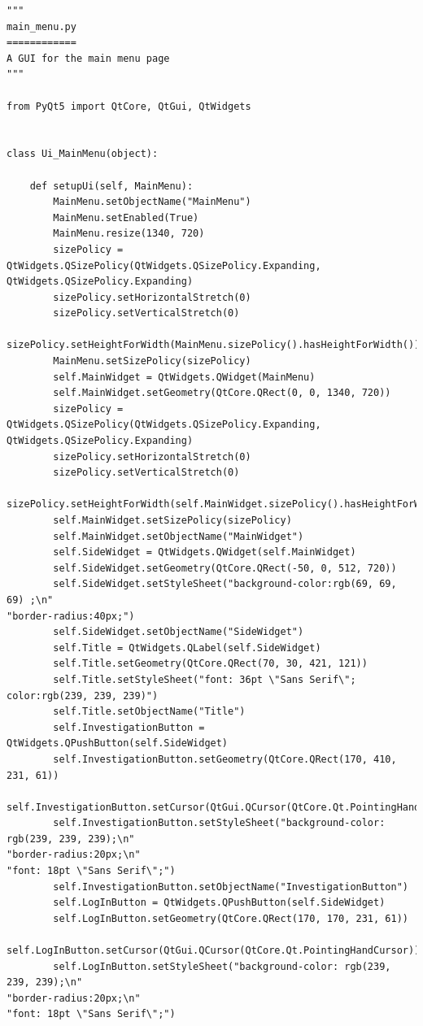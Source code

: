 \documentclass{article}
\begin{document}
\begin{lstlisting}
"""
main_menu.py
============
A GUI for the main menu page
"""

from PyQt5 import QtCore, QtGui, QtWidgets


class Ui_MainMenu(object):

    def setupUi(self, MainMenu):
        MainMenu.setObjectName("MainMenu")
        MainMenu.setEnabled(True)
        MainMenu.resize(1340, 720)
        sizePolicy = QtWidgets.QSizePolicy(QtWidgets.QSizePolicy.Expanding, QtWidgets.QSizePolicy.Expanding)
        sizePolicy.setHorizontalStretch(0)
        sizePolicy.setVerticalStretch(0)
        sizePolicy.setHeightForWidth(MainMenu.sizePolicy().hasHeightForWidth())
        MainMenu.setSizePolicy(sizePolicy)
        self.MainWidget = QtWidgets.QWidget(MainMenu)
        self.MainWidget.setGeometry(QtCore.QRect(0, 0, 1340, 720))
        sizePolicy = QtWidgets.QSizePolicy(QtWidgets.QSizePolicy.Expanding, QtWidgets.QSizePolicy.Expanding)
        sizePolicy.setHorizontalStretch(0)
        sizePolicy.setVerticalStretch(0)
        sizePolicy.setHeightForWidth(self.MainWidget.sizePolicy().hasHeightForWidth())
        self.MainWidget.setSizePolicy(sizePolicy)
        self.MainWidget.setObjectName("MainWidget")
        self.SideWidget = QtWidgets.QWidget(self.MainWidget)
        self.SideWidget.setGeometry(QtCore.QRect(-50, 0, 512, 720))
        self.SideWidget.setStyleSheet("background-color:rgb(69, 69, 69) ;\n"
"border-radius:40px;")
        self.SideWidget.setObjectName("SideWidget")
        self.Title = QtWidgets.QLabel(self.SideWidget)
        self.Title.setGeometry(QtCore.QRect(70, 30, 421, 121))
        self.Title.setStyleSheet("font: 36pt \"Sans Serif\"; color:rgb(239, 239, 239)")
        self.Title.setObjectName("Title")
        self.InvestigationButton = QtWidgets.QPushButton(self.SideWidget)
        self.InvestigationButton.setGeometry(QtCore.QRect(170, 410, 231, 61))
        self.InvestigationButton.setCursor(QtGui.QCursor(QtCore.Qt.PointingHandCursor))
        self.InvestigationButton.setStyleSheet("background-color: rgb(239, 239, 239);\n"
"border-radius:20px;\n"
"font: 18pt \"Sans Serif\";")
        self.InvestigationButton.setObjectName("InvestigationButton")
        self.LogInButton = QtWidgets.QPushButton(self.SideWidget)
        self.LogInButton.setGeometry(QtCore.QRect(170, 170, 231, 61))
        self.LogInButton.setCursor(QtGui.QCursor(QtCore.Qt.PointingHandCursor))
        self.LogInButton.setStyleSheet("background-color: rgb(239, 239, 239);\n"
"border-radius:20px;\n"
"font: 18pt \"Sans Serif\";")

\end{lstlisting}
\end{document}
